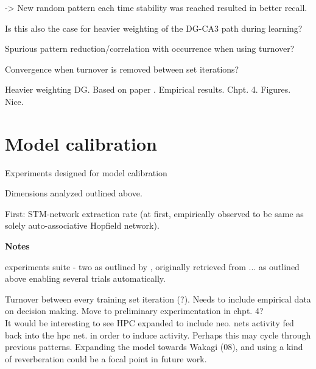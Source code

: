 -> New random pattern each time stability was reached resulted in better recall.

Is this also the case for heavier weighting of the DG-CA3 path during learning?

Spurious pattern reduction/correlation with occurrence when using turnover?

Convergence when turnover is removed between set iterations?

Heavier weighting DG. Based on paper \citep{Norman2003}. Empirical results. Chpt. 4. Figures. Nice.

\section*{Model calibration}

Experiments designed for model calibration

Dimensions analyzed outlined above.

First: STM-network extraction rate (at first, empirically observed to be same as solely auto-associative Hopfield network).


\textbf{Notes}

experiments suite - two as outlined by \citep{Hattori2014}, originally retrieved from ... as outlined above
enabling several trials automatically.

Turnover between every training set iteration (?). Needs to include empirical data on decision making. Move to preliminary experimentation in chpt. 4?
\\

It would be interesting to see HPC expanded to include neo. nets activity fed back into the hpc net. in order to induce activity. Perhaps this may cycle through previous patterns. Expanding the model towards Wakagi (08), and using a kind of reverberation could be a focal point in future work.


\cleardoublepage
